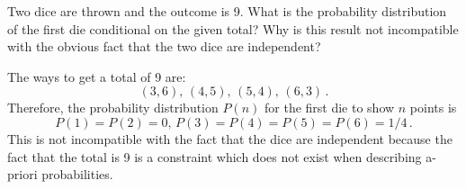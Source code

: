 

Two dice are thrown and the outcome is 9.
What is the probability distribution of the first die conditional on the given total?
Why is this result not incompatible with the obvious fact that the two dice are independent?

The ways to get a total of 9 are:
\begin{equation*}
(3, 6), \, (4, 5), \, (5, 4), \, (6, 3) \, .
\end{equation*}
Therefore, the probability distribution $P(n)$ for the first die to show $n$ points is
\begin{equation*}
P(1)=P(2)=0, \, P(3)=P(4)=P(5)=P(6)=1/4 \, .
\end{equation*}
This is not incompatible with the fact that the dice are independent because the fact that the total is 9 is a constraint which does not exist when describing a-priori probabilities.

